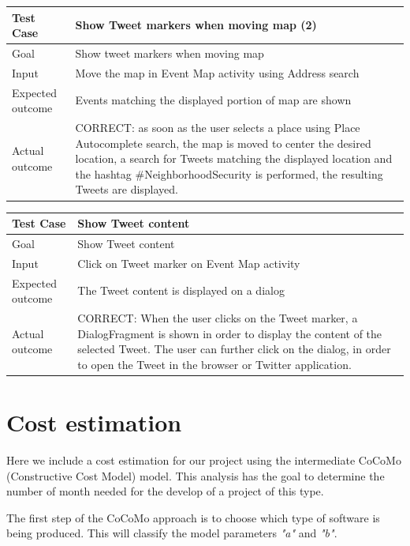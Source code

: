 \documentclass[a4paper]{scrreprt}
\begin{document}
\bigskip
\noindent
\begin{tabularx}{\linewidth}{|l|X|}
	\hline
	\textbf{Test Case} 	& \textbf{Show Tweet markers when moving map (2)} \\ \hline
	Goal 				& Show tweet markers when moving map \\ \hline
	Input 				& Move the map in Event Map activity using Address search\\ \hline
	Expected outcome 	& Events matching the displayed portion of map are shown \\ \hline
	Actual outcome 		& CORRECT: as soon as the user selects a place using Place Autocomplete search, the map is moved to center the desired location, a search for Tweets matching the displayed location and the hashtag \#NeighborhoodSecurity is performed, the resulting Tweets are displayed. \\ \hline
\end{tabularx}
\bigskip
\noindent
\begin{tabularx}{\linewidth}{|l|X|}
	\hline
	\textbf{Test Case} 	& \textbf{Show Tweet content} \\ \hline
	Goal 				& Show Tweet content \\ \hline
	Input 				& Click on Tweet marker on Event Map activity\\ \hline
	Expected outcome 	& The Tweet content is displayed on a dialog \\ \hline
	Actual outcome 		& CORRECT: When the user clicks on the Tweet marker, a DialogFragment is shown in order to display the content of the selected Tweet. The user can further click on the dialog, in order to open the Tweet in the browser or Twitter application. \\ \hline
\end{tabularx}


\chapter{Cost estimation}
Here we include a cost estimation for our project using the intermediate CoCoMo (Constructive Cost Model) model. This analysis has the goal to determine the number of month needed for the develop of a project of this type.

\bigskip The first step of the CoCoMo approach is to choose which type of software is being produced. This will classify the model parameters \emph{"a"} and \emph{"b"}.
\end{document}
